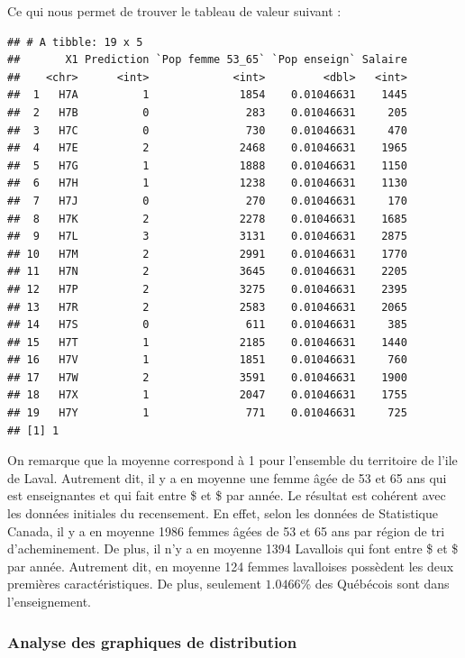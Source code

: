 \documentclass[11pt,french]{article}\usepackage[]{graphicx}\usepackage[]{color}
\makeatletter
\newenvironment{kframe}{%
 \def\at@end@of@kframe{}%
 \ifinner\ifhmode%
  \def\at@end@of@kframe{\end{minipage}}%
  \begin{minipage}{\columnwidth}%
 \fi\fi%
 \def\FrameCommand##1{\hskip\@totalleftmargin \hskip-\fboxsep
 \colorbox{shadecolor}{##1}\hskip-\fboxsep
     \hskip-\linewidth \hskip-\@totalleftmargin \hskip\columnwidth}%
 \MakeFramed {\advance\hsize-\width
   \@totalleftmargin\z@ \linewidth\hsize
   \@setminipage}}%
 {\par\unskip\endMakeFramed%
 \at@end@of@kframe}
\newenvironment{knitrout}{}{} %
\makeatother
\begin{document}
Ce qui nous permet de trouver le tableau de valeur suivant :
\begin{knitrout}
\color{fgcolor}\begin{kframe}
\begin{verbatim}
## # A tibble: 19 x 5
##       X1 Prediction `Pop femme 53_65` `Pop enseign` Salaire
##    <chr>      <int>             <int>         <dbl>   <int>
##  1   H7A          1              1854    0.01046631    1445
##  2   H7B          0               283    0.01046631     205
##  3   H7C          0               730    0.01046631     470
##  4   H7E          2              2468    0.01046631    1965
##  5   H7G          1              1888    0.01046631    1150
##  6   H7H          1              1238    0.01046631    1130
##  7   H7J          0               270    0.01046631     170
##  8   H7K          2              2278    0.01046631    1685
##  9   H7L          3              3131    0.01046631    2875
## 10   H7M          2              2991    0.01046631    1770
## 11   H7N          2              3645    0.01046631    2205
## 12   H7P          2              3275    0.01046631    2395
## 13   H7R          2              2583    0.01046631    2065
## 14   H7S          0               611    0.01046631     385
## 15   H7T          1              2185    0.01046631    1440
## 16   H7V          1              1851    0.01046631     760
## 17   H7W          2              3591    0.01046631    1900
## 18   H7X          1              2047    0.01046631    1755
## 19   H7Y          1               771    0.01046631     725
## [1] 1
\end{verbatim}
\end{kframe}
\end{knitrout}
On remarque que la moyenne correspond à 1 pour l'ensemble du territoire de l'ile de Laval. Autrement dit, il y a en moyenne une femme âgée de 53 et 65 ans qui est enseignantes et qui fait entre \$ et  \$  par année. Le résultat est cohérent avec les données initiales du recensement. En effet, selon les données de Statistique Canada, il y a en moyenne 1986 femmes âgées de 53 et 65 ans par région de tri d'acheminement. De plus, il n'y a en moyenne 1394 Lavallois qui font entre  \$ et  \$  par année. Autrement dit, en moyenne 124 femmes lavalloises possèdent les deux premières caractéristiques. De plus, seulement $1.0466$\% des Québécois sont dans l'enseignement. 

\subsubsection*{Analyse des graphiques de distribution}
\end{document}
